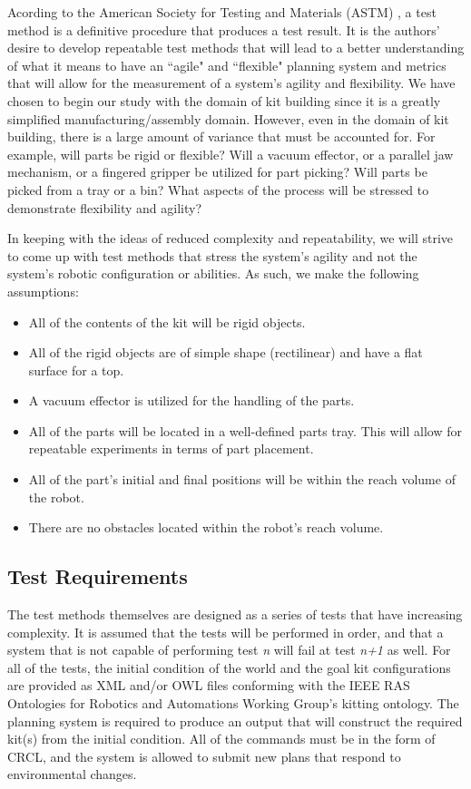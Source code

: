 Acording to the American Society for Testing and Materials (ASTM) \cite[p. vii]{ASTM99}, a test method is a
definitive procedure that produces a test result. It is the authors' desire to develop repeatable test methods that will
lead to a better understanding of what it means to have an ``agile" and ``flexible" planning system and metrics that 
will allow for the measurement of a system's agility and flexibility. We have chosen to begin our study
with the domain of kit building since it is a greatly simplified manufacturing/assembly domain. However, 
even in the domain of kit building, there is a large amount of variance that must be accounted for. For
example, will parts be rigid or flexible? Will a vacuum effector, or a parallel jaw mechanism, or a fingered 
gripper be utilized for part picking? Will parts be picked from a tray or a bin? What aspects of the
process will be stressed to demonstrate flexibility and agility?

In keeping with the ideas of reduced complexity and repeatability, we will strive to come up with test methods that stress
the system's agility and not the system's robotic configuration or abilities. As such, we make the following assumptions:
\begin{itemize}
	\item All of the contents of the kit will be rigid objects.
	\item All of the rigid objects are of simple shape (rectilinear) and have a flat surface for a top.
	\item A vacuum effector is utilized for the handling of the parts.
	\item All of the parts will be located in a well-defined parts tray. This will allow for repeatable experiments in terms of part placement.
	\item All of the part's initial and final positions will be within the reach volume of the robot.
	\item There are no obstacles located within the robot's reach volume.
\end{itemize}

\subsection{Test Requirements}
The test methods themselves are designed as a series of tests that have increasing complexity. It is assumed that the tests will be performed
in order, and that a system that is not capable of performing test {\it n} will fail at test {\it n+1} as well. For all of the tests,
the initial condition of the world and the goal kit configurations are provided as XML and/or OWL files conforming with the IEEE RAS Ontologies
for Robotics and Automations Working Group's kitting ontology. The planning system is required to produce an output that
will construct the required kit(s) from the initial condition. All of the commands must be in the form of CRCL, and the system
is allowed to submit new plans that respond to environmental changes.


